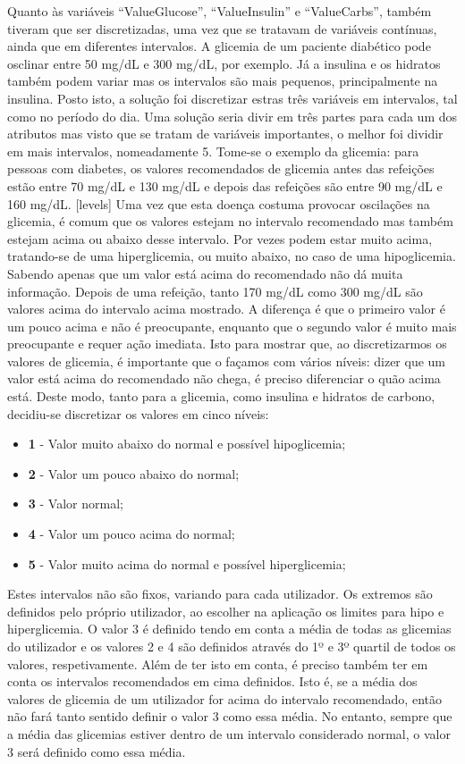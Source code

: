 Quanto às variáveis ``Value\textunderscore Glucose'', ``Value\textunderscore Insulin'' e ``Value\textunderscore Carbs'', também tiveram que ser discretizadas, uma vez que se tratavam de variáveis contínuas, ainda que em diferentes intervalos. A glicemia de um paciente diabético pode osclinar entre 50 mg/dL e 300 mg/dL, por exemplo. Já a insulina e os hidratos também podem variar mas os intervalos são mais pequenos, principalmente na insulina. 
Posto isto, a solução foi discretizar estras três variáveis em intervalos, tal como no período do dia. 
Uma solução seria divir em três partes para cada um dos atributos mas visto que se tratam de variáveis importantes, o melhor foi dividir em mais intervalos, nomeadamente 5.
Tome-se o exemplo da glicemia: para pessoas com diabetes, os valores recomendados de glicemia antes das refeições estão entre 70 mg/dL e 130 mg/dL e depois das refeições são entre 90 mg/dL e 160 mg/dL. [levels] Uma vez que esta doença costuma provocar oscilações na glicemia, é comum que os valores estejam no intervalo recomendado mas também estejam acima ou abaixo desse intervalo. Por vezes podem estar muito acima, tratando-se de uma hiperglicemia, ou muito abaixo, no caso de uma hipoglicemia. Sabendo apenas que um valor está acima do recomendado não dá muita informação. Depois de uma refeição, tanto 170 mg/dL como 300 mg/dL são valores acima do intervalo acima mostrado. A diferença é que o primeiro valor é um pouco acima e não é preocupante, enquanto que o segundo valor é muito mais preocupante e requer ação imediata. Isto para mostrar que, ao discretizarmos os valores de glicemia, é importante que o façamos com vários níveis: dizer que um valor está acima do recomendado não chega, é preciso diferenciar o quão acima está. Deste modo, tanto para a glicemia, como insulina e hidratos de carbono, decidiu-se discretizar os valores em cinco níveis:

\begin{itemize}
\item \textbf{1} - Valor muito abaixo do normal e possível hipoglicemia;
\item \textbf{2} - Valor um pouco abaixo do normal;
\item \textbf{3} - Valor normal;
\item \textbf{4} - Valor um pouco acima do normal;
\item \textbf{5} - Valor muito acima do normal e possível hiperglicemia;
\end{itemize}

Estes intervalos não são fixos, variando para cada utilizador. Os extremos são definidos pelo próprio utilizador, ao escolher na aplicação os limites para hipo e hiperglicemia. O valor 3 é definido tendo em conta a média de todas as glicemias do utilizador e os valores 2 e 4 são definidos através do 1º e 3º quartil de todos os valores, respetivamente. Além de ter isto em conta, é preciso também ter em conta os intervalos recomendados em cima definidos. Isto é, se a média dos valores de glicemia de um utilizador for acima do intervalo recomendado, então não fará tanto sentido definir o valor 3 como essa média. No entanto, sempre que a média das glicemias estiver dentro de um intervalo considerado normal, o valor 3 será definido como essa média.

